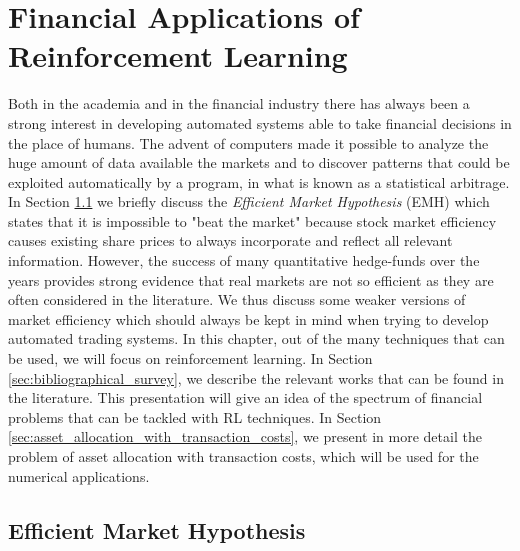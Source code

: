 \chapter{Financial Applications of Reinforcement Learning}
\label{ch:financial_applications_of_reinforcement_learning}

Both in the academia and in the financial industry there has always been 
a strong interest in developing automated systems able to take financial decisions 
in the place of humans. The advent of computers made it possible to analyze the huge amount of data available the markets and to discover patterns that could be exploited automatically by a program, in what is known as a statistical arbitrage. In Section \ref{sec:efficient_market_hypothesis} we briefly discuss the \emph{Efficient Market Hypothesis} (EMH) which states that it is impossible to "beat the market" because stock market efficiency causes existing share prices to always incorporate and reflect all relevant information. However, the success of many quantitative hedge-funds over the years provides strong evidence that real markets are not so efficient as they are often considered in the literature. We thus discuss some weaker versions of market efficiency which should always be kept in mind when trying to develop automated trading systems. In this chapter, out of the many techniques that can be used, we will focus on reinforcement learning. In Section \ref{sec:bibliographical_survey}, we describe the relevant works that can be found in the literature. This presentation will give an idea of the spectrum of financial problems that can be tackled with RL techniques. In Section \ref{sec:asset_allocation_with_transaction_costs}, we present in more detail the problem of asset allocation with transaction costs, which will be used for the numerical applications.

\section{Efficient Market Hypothesis}  
\label{sec:efficient_market_hypothesis}

